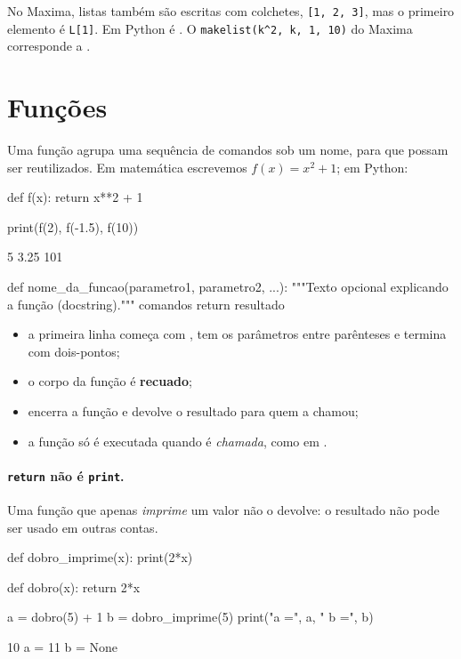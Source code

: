 \begin{maxima}
No Maxima, listas também são escritas com colchetes, \texttt{[1, 2, 3]}, mas o primeiro elemento é
\texttt{L[1]}. Em Python é . O \texttt{makelist(k\^{}2, k, 1, 10)} do Maxima corresponde a
.
\end{maxima}

\section{Funções}

Uma função agrupa uma sequência de comandos sob um nome, para que possam ser reutilizados. Em matemática
escrevemos $f(x)=x^2+1$; em Python:

\begin{entrada}
def f(x):
    return x**2 + 1

print(f(2), f(-1.5), f(10))
\end{entrada}
\begin{saida}
5 3.25 101
\end{saida}

\begin{sintaxe}
def nome_da_funcao(parametro1, parametro2, ...):
    """Texto opcional explicando a função (docstring)."""
    comandos
    return resultado
\end{sintaxe}

\begin{itemize}
  \item a primeira linha começa com , tem os parâmetros entre parênteses e termina com dois-pontos;
  \item o corpo da função é \textbf{recuado};
  \item {} encerra a função e devolve o resultado para quem a chamou;
  \item a função só é executada quando é \emph{chamada}, como em .
\end{itemize}

\paragraph{\texttt{return} não é \texttt{print}.} Uma função que apenas \emph{imprime} um valor não o devolve: o
resultado não pode ser usado em outras contas.

\begin{entrada}
def dobro_imprime(x):
    print(2*x)

def dobro(x):
    return 2*x

a = dobro(5) + 1
b = dobro_imprime(5)
print("a =", a, "  b =", b)
\end{entrada}
\begin{saida}
10
a = 11   b = None
\end{saida}

